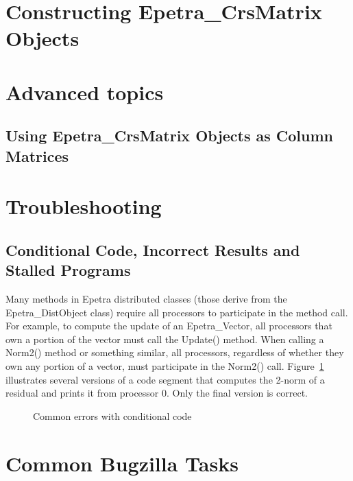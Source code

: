 \documentclass[12pt,relax]{EpetraUserGuide}
\renewcommand{\vector}{Epetra\_Vector}
\newcommand{\crsmatrix}{Epetra\_CrsMatrix}
\newcommand{\distobject}{Epetra\_DistObject}
\begin{document}
\section{Constructing \crsmatrix{} Objects}
\label{Section:ConstructingCrsMatrices}

\section{ Advanced topics}
\subsection {Using \crsmatrix{} Objects as Column Matrices}

\clearpage



\appendix
\section{Troubleshooting}
\label{Section:Troubleshooting}
\subsection{Conditional Code, Incorrect Results and Stalled Programs}
Many methods in Epetra distributed classes (those derive from the
\distobject{} class) require all processors to
participate in the method call.  For example, to compute the update of
an \vector{}, all processors that own a portion of the vector must
call the Update() method.  When calling a Norm2() method or something
similar, all processors, regardless of whether they own any portion of
a vector, must participate in the Norm2() call.  
Figure~\ref{Figure:HungCode} illustrates
several versions of a code segment that computes the 2-norm of a residual
and prints it from processor 0.  Only the final version is correct.
\begin{figure}
\begin{center}

\end{center}
\caption{\label{Figure:HungCode} Common errors with conditional code}
\end{figure}

\section{Common Bugzilla Tasks}
\label{Section:Bugzilla}
\end{document}
